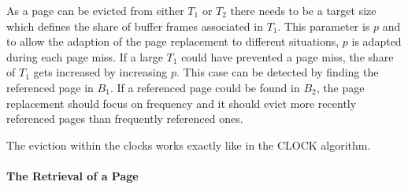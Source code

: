     As a page can be evicted from either $T_1$ or $T_2$ there needs to be a target size which defines the share of buffer frames associated in $T_1$. This parameter is $p$ and to allow the adaption of the page replacement to different situations, $p$ is adapted during each page miss. If a large $T_1$ could have prevented a page miss, the share of $T_1$ gets increased by increasing $p$. This case can be detected by finding the referenced page in $B_1$. If a referenced page could be found in $B_2$, the page replacement should focus on frequency and it should evict more recently referenced pages than frequently referenced ones.

    The eviction within the clocks works exactly like in the CLOCK algorithm.

\paragraph{The Retrieval of a Page}

